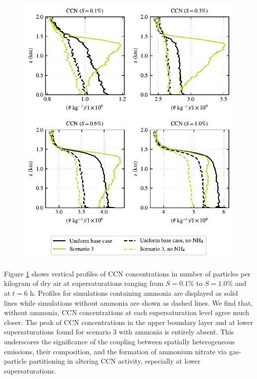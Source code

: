 \documentclass[journal abbreviation, manuscript]{copernicus}
\begin{document}
\begin{figure}[!h]
	\centering
	\includegraphics[]{figures/aerosol-ccn-vertical-profiles-no-nh4-cases-time36.pdf}
	\caption{}
	\label{fig:ccn-vertical-profile-no-ammonia}
\end{figure}

Figure \ref{fig:ccn-vertical-profile-no-ammonia} shows vertical profiles of CCN concentrations in number of particles per kilogram of dry air at supersaturations ranging from $S=0.1\%$ to $S=1.0\%$ and at $t=6$ h. Profiles for simulations containing ammonia are displayed as solid lines while simulations without ammonia are shown as dashed lines. We find that, without ammonia, CCN concentrations at each supersaturation level agree much closer. The peak of CCN concentrations in the upper boundary layer and at lower supersaturations found for scenario 3 with ammonia is entirely absent. This underscores the significance of the coupling between spatially heterogeneous emissions, their composition, and the formation of ammonium nitrate via gas-particle partitioning in altering CCN activity, especially at lower supersaturations. 
\end{document}

